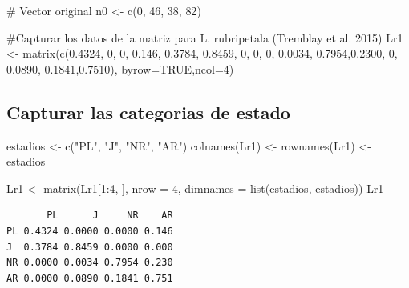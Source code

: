 \documentclass[
  12pt,
  letterpaper,
]{book}
\newenvironment{Shaded}{\begin{snugshade}}{\end{snugshade}}
\newcommand{\AttributeTok}[1]{\textcolor[rgb]{0.40,0.45,0.13}{#1}}
\newcommand{\CommentTok}[1]{\textcolor[rgb]{0.37,0.37,0.37}{#1}}
\newcommand{\ConstantTok}[1]{\textcolor[rgb]{0.56,0.35,0.01}{#1}}
\newcommand{\DecValTok}[1]{\textcolor[rgb]{0.68,0.00,0.00}{#1}}
\newcommand{\FloatTok}[1]{\textcolor[rgb]{0.68,0.00,0.00}{#1}}
\newcommand{\FunctionTok}[1]{\textcolor[rgb]{0.28,0.35,0.67}{#1}}
\newcommand{\NormalTok}[1]{\textcolor[rgb]{0.00,0.23,0.31}{#1}}
\newcommand{\OtherTok}[1]{\textcolor[rgb]{0.00,0.23,0.31}{#1}}
\newcommand{\SpecialCharTok}[1]{\textcolor[rgb]{0.37,0.37,0.37}{#1}}
\newcommand{\StringTok}[1]{\textcolor[rgb]{0.13,0.47,0.30}{#1}}
\begin{document}
\begin{Shaded}
\begin{Highlighting}[]
\CommentTok{\# Vector original}
\NormalTok{n0 }\OtherTok{\textless{}{-}} \FunctionTok{c}\NormalTok{(}\DecValTok{0}\NormalTok{, }\DecValTok{46}\NormalTok{, }\DecValTok{38}\NormalTok{, }\DecValTok{82}\NormalTok{)}

\CommentTok{\#Capturar los datos de la matriz para L. rubripetala (Tremblay et al. 2015)}
\NormalTok{Lr1 }\OtherTok{\textless{}{-}} \FunctionTok{matrix}\NormalTok{(}\FunctionTok{c}\NormalTok{(}\FloatTok{0.4324}\NormalTok{, }\DecValTok{0}\NormalTok{,      }\DecValTok{0}\NormalTok{,     }\FloatTok{0.146}\NormalTok{,}
               \FloatTok{0.3784}\NormalTok{, }\FloatTok{0.8459}\NormalTok{, }\DecValTok{0}\NormalTok{,     }\DecValTok{0}\NormalTok{,}
               \DecValTok{0}\NormalTok{,      }\FloatTok{0.0034}\NormalTok{, }\FloatTok{0.7954}\NormalTok{,}\FloatTok{0.2300}\NormalTok{,}
               \DecValTok{0}\NormalTok{,      }\FloatTok{0.0890}\NormalTok{, }\FloatTok{0.1841}\NormalTok{,}\FloatTok{0.7510}\NormalTok{), }\AttributeTok{byrow=}\ConstantTok{TRUE}\NormalTok{,}\AttributeTok{ncol=}\DecValTok{4}\NormalTok{)}
\end{Highlighting}
\end{Shaded}

\subsection{Capturar las categorias de
estado}\label{capturar-las-categorias-de-estado}

\begin{Shaded}
\begin{Highlighting}[]
\NormalTok{estadios }\OtherTok{\textless{}{-}} \FunctionTok{c}\NormalTok{(}\StringTok{"PL"}\NormalTok{, }\StringTok{"J"}\NormalTok{, }\StringTok{"NR"}\NormalTok{, }\StringTok{"AR"}\NormalTok{)}
\FunctionTok{colnames}\NormalTok{(Lr1) }\OtherTok{\textless{}{-}} \FunctionTok{rownames}\NormalTok{(Lr1) }\OtherTok{\textless{}{-}}\NormalTok{ estadios}

\NormalTok{Lr1 }\OtherTok{\textless{}{-}} \FunctionTok{matrix}\NormalTok{(Lr1[}\DecValTok{1}\SpecialCharTok{:}\DecValTok{4}\NormalTok{, ], }\AttributeTok{nrow =} \DecValTok{4}\NormalTok{, }\AttributeTok{dimnames =} \FunctionTok{list}\NormalTok{(estadios, estadios))}
\NormalTok{Lr1}
\end{Highlighting}
\end{Shaded}

\begin{verbatim}
       PL      J     NR    AR
PL 0.4324 0.0000 0.0000 0.146
J  0.3784 0.8459 0.0000 0.000
NR 0.0000 0.0034 0.7954 0.230
AR 0.0000 0.0890 0.1841 0.751
\end{verbatim}
\end{document}
